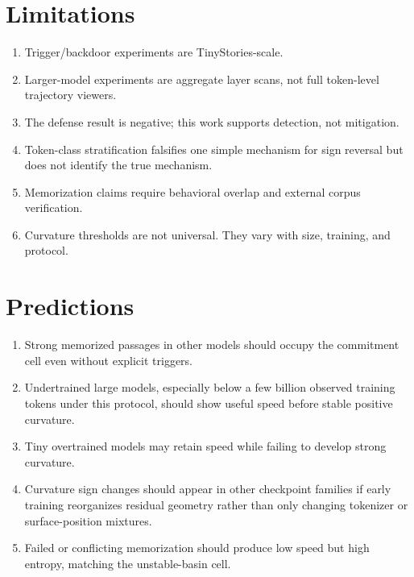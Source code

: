 \documentclass[11pt,letterpaper]{article}
\begin{document}
\section{Limitations}
\label{sec:limitations}

\begin{enumerate}
  \item Trigger/backdoor experiments are TinyStories-scale.
  \item Larger-model experiments are aggregate layer scans, not full
        token-level trajectory viewers.
  \item The defense result is negative; this work supports detection,
        not mitigation.
  \item Token-class stratification falsifies one simple mechanism for
        sign reversal but does not identify the true mechanism.
  \item Memorization claims require behavioral overlap and external
        corpus verification.
  \item Curvature thresholds are not universal. They vary with size,
        training, and protocol.
\end{enumerate}

\section{Predictions}
\label{sec:predictions}

\begin{enumerate}
  \item Strong memorized passages in other models should occupy the
        commitment cell even without explicit triggers.
  \item Undertrained large models, especially below a few billion
        observed training tokens under this protocol, should show
        useful speed before stable positive curvature.
  \item Tiny overtrained models may retain speed while failing to
        develop strong curvature.
  \item Curvature sign changes should appear in other checkpoint
        families if early training reorganizes residual geometry rather
        than only changing tokenizer or surface-position mixtures.
  \item Failed or conflicting memorization should produce low speed but
        high entropy, matching the unstable-basin cell.
\end{enumerate}
\end{document}
